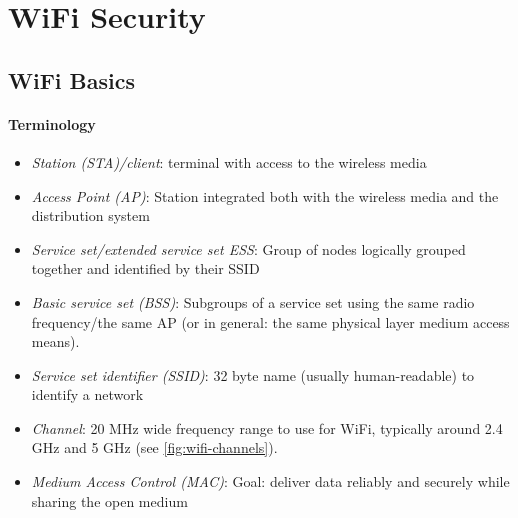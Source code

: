 \section{WiFi Security}


\subsection{WiFi Basics}

\paragraph{Terminology}
\begin{itemize}
	\item \textit{Station (STA)/client}: terminal with access to the wireless media
	\item \textit{Access Point (AP)}: Station integrated both with the wireless media and the distribution system
	\item \textit{Service set/extended service set ESS}: Group of nodes logically grouped together and identified by their SSID
	\item \textit{Basic service set (BSS)}: Subgroups of a service set using the same radio frequency/the same AP (or in general: the same physical layer medium access means).
	\item \textit{Service set identifier (SSID)}: 32 byte name (usually human-readable) to identify a network
	\item \textit{Channel}: 20 MHz wide frequency range to use for WiFi, typically around 2.4 GHz and 5 GHz (see \autoref{fig:wifi-channels}).
	\item \textit{Medium Access Control (MAC)}: Goal: deliver data reliably and securely while sharing the open medium
\end{itemize}

